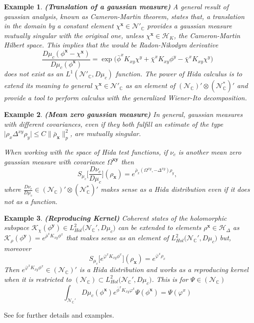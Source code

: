 \documentclass[12pt]{article}%
\newtheorem{example}{Example}%
\begin{document}
\begin{example}{\bf (Translation of a gaussian measure)}
    \label{ex:translations} A general result of gaussian analysis, known as Cameron-Martin theorem, states that,  a translation in the domain by a constant element $\chi^\mathbf{x}\in \mathcal{N}'_\mathbb{C}$ provides a gaussian measure mutually singular with the original  one, unless $\chi^\mathbf{x}\in \mathcal{H}_K$, the Cameron-Martin Hilbert space. This implies that the \textit{would be Radon-Nikodym derivative}
    $$\frac{D\mu_c(\phi^\mathbf{x}-\chi^\mathbf{x})}{D\mu_c(\phi^\mathbf{x})}=\exp{\big(\bar\phi^xK_{xy}\chi^y+\bar\chi^xK_{xy}\phi^y-\bar\chi^xK_{xy}\chi^y\big)}$$
does not exist as an $L^1(\mathcal{N}'_\mathbb{C},D\mu_c)$ function. The power of Hida calculus is to extend its meaning to general $\chi^\mathbf{x}\in \mathcal{N}'_\mathbb{C}$ as an element of $(\mathcal{N}_{\mathbb{C}})'\otimes (\mathcal{N}_\mathbb{C}^*)'$ and provide a tool to perform  calculus with the generalized Wiener-Ito decomposition. 
\end{example}
 

\begin{example}{\bf (Mean zero gaussian measure)}
\label{ex:meanZeroGaussian} In general, gaussian measures with different covariances, even if they both fulfill an estimate of the type $\lvert\rho_x\Delta^{xy}\rho_y \rvert \leq C \| \bar\rho_{\mathbf{x}} \|_p^2 $, are mutually singular.  

 When working with the space of Hida test functions, if $\nu_c$ is
 another mean zero gaussian measure with covariance $\Omega^{\mathbf{xy}}$ then 
$$S_{\mu_c}\Big[\frac{D\nu_c}{D\mu_c}\Big](\rho_\mathbf{x})=e^{\bar\rho_x(\Omega^{xy},-\Delta^{xy})\rho_y},$$
where $\frac{D\nu_c}{D\mu_c}\in (\mathcal{N}_{\mathbb{C}})'\otimes (\mathcal{N}_\mathbb{C}^*)'$ makes sense as a Hida distribution even if it does not  as a function.  
\end{example}


\begin{example}{\bf (Reproducing Kernel)}
    \label{ex:repKernel} Coherent states of the holomorphic subspace $\mathcal{K}_{\chi}(\phi^{\mathbf{y}})\in L^2_{Hol}\big({\mathcal{N}_{\mathbb{C}}'},D\mu_c\big)$ can be extended to elements $\rho^{\mathbf{x}}\in \mathcal{H}_\Delta$ as $ \mathcal{K}_\rho(\phi^{\mathbf{y}})=e^{\bar\rho^xK_{xy}\phi^x}$ that makes sense as an element of  $L^2_{Hol}\big({\mathcal{N}_{\mathbb{C}}'},D\mu_c\big)$ but, moreover 
    $$S_{\mu_c}\Big[ e^{\bar\varphi^xK_{xy}\phi^x}\Big](\rho_\mathbf{x})=e^{\bar\varphi^x\rho_x}$$
    Then  $e^{\bar\varphi^xK_{xy}\phi^x}\in (\mathcal{N}_{\mathbb{C}})'$ 
    is a Hida distribution and works as a reproducing kernel when it is restricted to $(\mathcal{N}_{\mathbb{C}})\subset L^2_{Hol}\big({\mathcal{N}_{\mathbb{C}}'},D\mu_c\big)$. This is for $\Psi\in  (\mathcal{N}_{\mathbb{C}})$
    \begin{equation}
    \label{eq:rpekernelHida}
    \int_{\mathcal{N}_{\mathbb{C}}'}D\mu_c(\phi^{\mathbf{x}})e^{\bar\phi^xK_{xy}\varphi^x}\Psi(\phi^{\mathbf{x}})= \Psi(\varphi^x)
    \end{equation}
    \end{example}
\noindent See \cite{Hida1993} for further details and examples. 
\end{document}
